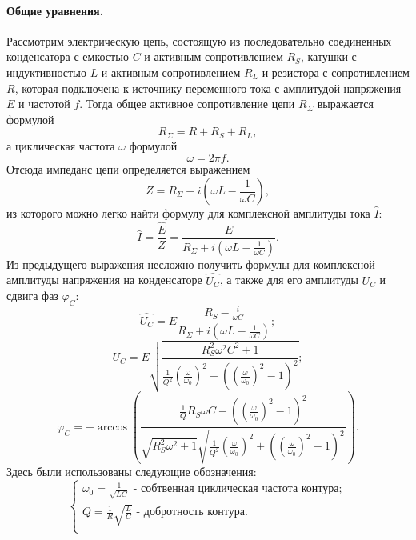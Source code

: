 \documentclass[12pt,a4paper]{article}
\begin{document}
\paragraph{Общие уравнения.} Рассмотрим электрическую цепь, состоящую из последовательно соединенных конденсатора с емкостью $C$ и активным сопротивлением $R_S$, катушки с индуктивностью $L$ и активным сопротивлением $R_L$ и резистора с сопротивлением $R$, которая подключена к источнику переменного тока с амплитудой напряжения $E$ и частотой $f$. Тогда общее активное сопротивление цепи $R_\Sigma$ выражается формулой
\begin{equation}
R_\Sigma = R + R_S + R_L\label{rsum},
\end{equation}
а циклическая частота $\omega$ формулой
 \begin{equation}
\omega = 2\pi f\label{omeg}.
\end{equation}
Отсюда импеданс цепи определяется выражением
\begin{equation}
Z = R_\Sigma + i\left(\omega L - \frac{1}{\omega C}\right)\label{imp},
\end{equation}
из которого можно легко найти формулу для комплексной амплитуды тока $\widehat{I}$:
\begin{equation}
\widehat{I} = \frac{\widehat{E}}{Z} = \frac{E}{R_\Sigma + i\left(\omega L - \frac{1}{\omega C}\right)}\label{Ic}.
\end{equation}
Из предыдущего выражения несложно получить формулы для комплексной амплитуды напряжения на конденсаторе $\widehat{U_C}$, а также для его амплитуды $U_C$ и сдвига фаз $\varphi_C$:
\begin{equation}
\widehat{U_C} = E\frac{R_S - \frac{i}{\omega C}}{R_\Sigma + i\left(\omega L - \frac{1}{\omega C}\right)}\label{ucc};
\end{equation}
\begin{equation}
U_C = E\sqrt{\frac{R_S^2\omega^2C^2+1}{\frac{1}{Q^2}\left(\frac{\omega}{\omega_0}\right)^2 + \left(\left(\frac{\omega}{\omega_0}\right)^2-1\right)^2}}\label{uc};
\end{equation}
\begin{equation}
\varphi_C = -\arccos\left(\frac{\frac{1}{Q}R_S\omega C - \left(\left(\frac{\omega}{\omega_0}\right)^2-1\right)^2}{\sqrt{R_S^2\omega^2+1}\sqrt{\frac{1}{Q^2}\left(\frac{\omega}{\omega_0}\right)^2 + \left(\left(\frac{\omega}{\omega_0}\right)^2-1\right)^2}}\right)\label{phic}.
\end{equation}
Здесь были использованы следующие обозначения:
\begin{equation}
\begin{cases}
\omega_0 = \frac{1}{\sqrt{LC}}\text{ - собтвенная циклическая частота контура};\\
Q = \frac{1}{R}\sqrt{\frac{L}{C}}\text{ - добротность контура}.\\ 
\end{cases}\label{redef}
\end{equation}
\end{document}
